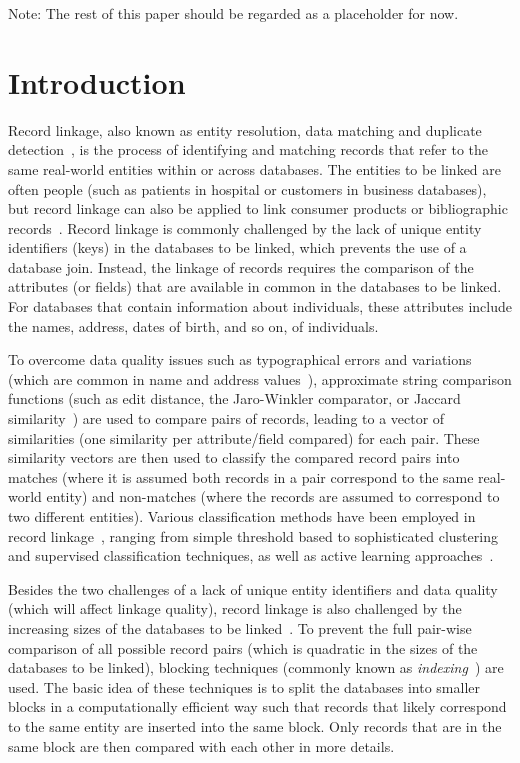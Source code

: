 \documentclass{llncs}
\begin{document}
Note: The rest of this paper should be regarded as a placeholder for now.


\section{Introduction}
\label{sec-intro}


Record linkage, also known as entity resolution, data matching and
duplicate detection~\cite{Chr12}, is the process of identifying and
matching records that refer to the same real-world entities within or
across databases. The entities to be linked are often people (such as 
patients in hospital or customers in business databases), but record
linkage can also be applied to link consumer products or bibliographic
records~\cite{Chr12}. Record linkage is commonly challenged by the
lack of unique entity identifiers (keys) in the databases to be linked,
which prevents the use of a database join. Instead, the linkage of
records requires the comparison of the attributes (or fields) that are
available in common in the databases to be linked. For databases that
contain information about individuals, these attributes include the
names, address, dates of birth, and so on, of individuals.

To overcome data quality issues such as typographical errors and
variations (which are common in name and address values~\cite{Chr12}),
approximate string comparison functions (such as edit distance, the
Jaro-Winkler comparator, or Jaccard similarity~\cite{Chr12}) are used
to compare pairs of records, leading to a vector of similarities (one
similarity per attribute/field compared) for each pair. These
similarity vectors are then used to classify the compared record
pairs into matches (where it is assumed both records in a pair
correspond to the same real-world entity) and non-matches (where the
records are assumed to correspond to two different entities). Various
classification methods have been employed in record
linkage~\cite{Chr12,Don15}, ranging from simple threshold based to
sophisticated clustering and supervised classification techniques, as
well as active learning approaches~\cite{Wan15}.

Besides the two challenges of a lack of unique entity identifiers and
data quality (which will affect linkage quality), record linkage is
also challenged by the increasing sizes of the databases to be
linked~\cite{Don15}. To prevent the full pair-wise comparison of all
possible record pairs (which is quadratic in the sizes of the
databases to be linked), blocking techniques (commonly known as
\emph{indexing}~\cite{Chr12b}) are used. The basic idea of these
techniques is to split the databases into smaller blocks in a
computationally efficient way such that records that likely correspond
to the same entity are inserted into the same block. Only records that
are in the same block are then compared with each other in more
details.
\end{document}

